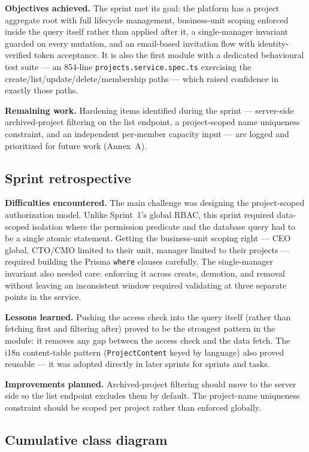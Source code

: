 \textbf{Objectives achieved.} The sprint met its goal: the platform has a project aggregate root
with full lifecycle management, business-unit scoping enforced inside the query itself rather
than applied after it, a single-manager invariant guarded on every mutation, and an email-based
invitation flow with identity-verified token acceptance. It is also the first module with a dedicated
behavioural test suite --- an 854-line \texttt{projects.service.spec.ts} exercising the
create/list/update/delete/membership paths --- which raised confidence in exactly those paths.

\textbf{Remaining work.} Hardening items identified during the sprint --- server-side
archived-project filtering on the list endpoint, a project-scoped name uniqueness constraint, and
an independent per-member capacity input --- are logged and prioritized for future work (Annex~A).

\subsection{Sprint retrospective}

\textbf{Difficulties encountered.} The main challenge was designing the project-scoped
authorization model. Unlike Sprint~1's global RBAC, this sprint required data-scoped isolation
where the permission predicate and the database query had to be a single atomic statement.
Getting the business-unit scoping right --- CEO global, CTO/CMO limited to their unit, manager
limited to their projects --- required building the Prisma \texttt{where} clauses carefully. The
single-manager invariant also needed care: enforcing it across create, demotion, and removal
without leaving an inconsistent window required validating at three separate points in the
service.

\textbf{Lessons learned.} Pushing the access check into the query itself (rather than fetching
first and filtering after) proved to be the strongest pattern in the module: it removes any gap
between the access check and the data fetch. The i18n content-table pattern
(\texttt{ProjectContent} keyed by language) also proved reusable --- it was adopted directly in
later sprints for sprints and tasks.

\textbf{Improvements planned.} Archived-project filtering should move to the server side so the
list endpoint excludes them by default. The project-name uniqueness constraint should be scoped
per project rather than enforced globally.

\subsection{Cumulative class diagram}

